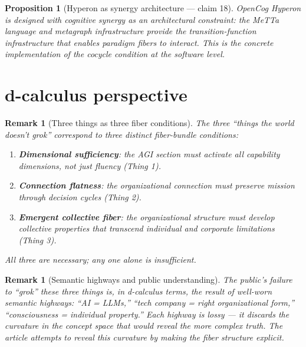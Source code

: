 \documentclass[11pt,a4paper]{article}
\newtheorem{proposition}[definition]{Proposition}
\newtheorem{remark}[definition]{Remark}
\begin{document}
\begin{proposition}[Hyperon as synergy architecture --- claim 18]
\label{prop:hyperon}
OpenCog Hyperon is designed with cognitive synergy as an architectural
constraint: the MeTTa language and metagraph infrastructure provide the
transition-function infrastructure that enables paradigm fibers to
interact. This is the concrete implementation of the cocycle condition
at the software level.
\end{proposition}

\section{d-calculus perspective}
\label{sec:d-calc}

\begin{remark}[Three things as three fiber conditions]
The three ``things the world doesn't grok'' correspond to three distinct
fiber-bundle conditions:
\begin{enumerate}
\item \textbf{Dimensional sufficiency}: the AGI section must activate all
  capability dimensions, not just fluency (Thing 1).
\item \textbf{Connection flatness}: the organizational connection must
  preserve mission through decision cycles (Thing 2).
\item \textbf{Emergent collective fiber}: the organizational structure must
  develop collective properties that transcend individual and corporate
  limitations (Thing 3).
\end{enumerate}
All three are necessary; any one alone is insufficient.
\end{remark}

\begin{remark}[Semantic highways and public understanding]
The public's failure to ``grok'' these three things is, in d-calculus
terms, the result of well-worn semantic highways: ``AI = LLMs,''
``tech company = right organizational form,'' ``consciousness = individual
property.'' Each highway is lossy --- it discards the curvature in the
concept space that would reveal the more complex truth. The article
attempts to reveal this curvature by making the fiber structure explicit.
\end{remark}
\end{document}
